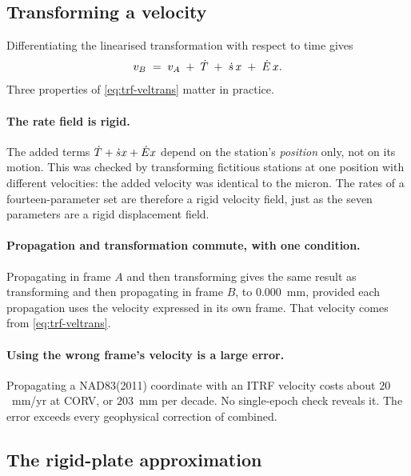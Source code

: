 \documentclass[main.tex]{subfiles}
\begin{document}
\subsection{Transforming a velocity}\label{sec:trf-veltrans}

Differentiating the linearised transformation with respect to time gives
\begin{equation}
v_B \;=\; v_A \;+\; \dot{T}
              \;+\; \dot{s}\,x \;+\; \dot{E}\,x.
\label{eq:trf-veltrans}
\end{equation}
Three properties of \eqref{eq:trf-veltrans} matter in practice.

\paragraph{The rate field is rigid.}  The added terms
$\dot{T} + \dot{s}x + \dot{E}x$ depend on the
station's \emph{position} only, not on its motion.  This was checked by
transforming fictitious stations at one position with different
velocities: the added velocity was identical to the micron.  The rates
of a fourteen-parameter set are therefore a rigid velocity field, just
as the seven parameters are a rigid displacement field.

\paragraph{Propagation and transformation commute, with one condition.}
Propagating in frame $A$ and then transforming gives the same result as
transforming and then propagating in frame $B$, to $0.000$~mm, provided
each propagation uses the velocity expressed in its own frame.  That
velocity comes from \eqref{eq:trf-veltrans}.

\paragraph{Using the wrong frame's velocity is a large error.}
Propagating a NAD83(2011) coordinate with an ITRF velocity costs about
$20$~mm/yr at CORV, or $203$~mm per decade.  No single-epoch check
reveals it.  The error exceeds every geophysical correction of
 combined.

\subsection{The rigid-plate approximation}\label{sec:trf-plate}
\end{document}
